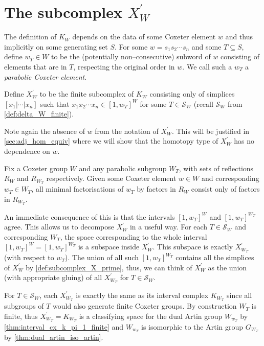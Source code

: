 \documentclass[class=article, crop=false]{standalone}
\begin{document}
\section{The subcomplex \texorpdfstring{$X_{W}^\prime$}{X W Prime}}
The definition of $K_{W}$ depends on the data of some Coxeter element $w$ and thus implicitly on some generating set $S$. For some $w = s_1s_2\cdots s_n$ and some $T\subseteq S$, define $w_T\in W$ to be the (potentially non--consecutive) subword of $w$ consisting of elements that are in $T$, respecting the original order in $w$. We call such a $w_T$ a \emph{parabolic Coxeter element}.
\begin{definition}
    Define $X_{W}^\prime$ to be the finite subcomplex of $K_{W}$ consisting only of simplices $[x_1 | \cdots | x_n]$ such that $x_1x_2\cdots x_n \in [1,w_T]^W$ for some $T \in \mathcal{S}_W$ (recall $\mathcal{S}_W$ from \cref{def:delta_W_finite}).
    \label{def:subcomplex_X_prime}
\end{definition}
Note again the absence of $w$ from the notation of $X^\prime_W$. This will be justified in \cref{sec:adj_hom_equiv} where we will show that the homotopy type of $X_W^\prime$ has no dependence on $w$.

\begin{lemma}[{\hspace{1sp}\cite[Lemma 5.2]{paolini_salvetti_kpi1_2021}}]
    Fix a Coxeter group $W$ and any parabolic subgroup $W_T$, with sets of reflections $R_W$ and $R_{W_T}$ respectively. Given some Coxeter element $w \in W$ and corresponding $w_T \in W_T$, all minimal factorisations of $w_T$ by factors in $R_W$ consist only of factors in $R_{W_T}$.
    \label{lem:all_decompositions_of_w_T_are_R}
\end{lemma}
An immediate consequence of this is that the intervals $[1,w_T]^W$ and $[1,w_T]^{W_T}$ agree. This allows us to decompose $X^\prime_W$ in a useful way. For each $T \in \mathcal{S}_W$ and corresponding $W_T$, the space corresponding to the whole interval $[1, w_T]^W=[1,w_T]^{W_T}$ is a subspace inside $X^\prime_W$. This subspace is exactly $X^\prime_{W_T}$ (with respect to $w_T$). The union of all such $[1,w_T]^{W_T}$ contains all the simplices of $X_W^\prime$ by \cref{def:subcomplex_X_prime}, thus, we can think of $X^\prime_W$ as the union (with appropriate gluing) of all $X^\prime_{W_T}$ for $T \in \mathcal{S}_W$.

For $T \in \mathcal{S}_W$, each $X^\prime_{W_T}$ is exactly the same as its interval complex $K_{{W_T}}$ since all subgroups of $T$ would also generate finite Coxeter groups. By construction $W_T$ is finite, thus $X^\prime_{W_T} = K_{W_T}$ is a classifying space for the dual Artin group $W_{w_T}$ by \cref{thm:interval_cx_k_pi_1_finite} and $W_{w_T}$ is isomorphic to the Artin group $G_{W_T}$ by \cref{thm:dual_artin_iso_artin}.
\end{document}
